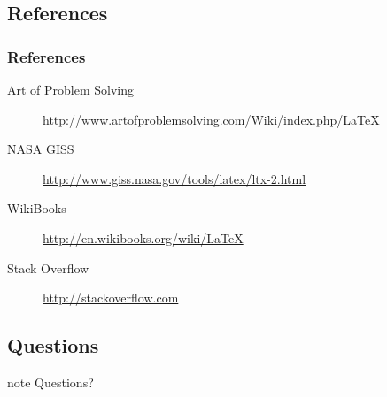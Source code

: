 \subsection{References}
\begin{frame}
\frametitle{References}
\begin{description}
    \item[Art of Problem Solving] \url{http://www.artofproblemsolving.com/Wiki/index.php/LaTeX}
    \item[NASA GISS] \url{http://www.giss.nasa.gov/tools/latex/ltx-2.html}
    \item[WikiBooks] \url{http://en.wikibooks.org/wiki/LaTeX}
    \item[Stack Overflow] \url{http://stackoverflow.com}
\end{description}
\end{frame}

\subsection{Questions}
\begin{frame}
\begin{beamercolorbox}[center,shadow=true,rounded=true,]{note}
        Questions?
\end{beamercolorbox}
\end{frame} 
